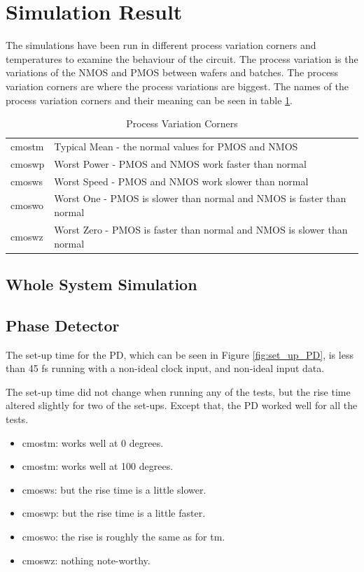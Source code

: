 \documentclass[a4paper,12pt]{article} \usepackage{graphicx}
\begin{document}
\section{Simulation Result}
The simulations have been run in different process variation corners and
temperatures to examine the behaviour of the circuit. The process variation is
the variations of the NMOS and PMOS between wafers and batches. 
The process variation corners are where the process variations are biggest.
The names of the process variation corners and their meaning can be seen in
table \ref{tab:corners}.

\begin{table}[h!]
        \centering
        \begin{tabular}{|l|l|}
                \hline 
                cmostm & Typical Mean - the normal values for PMOS and NMOS \\
                cmoswp & Worst Power - PMOS and NMOS work faster than normal \\
                cmosws & Worst Speed - PMOS and NMOS work slower than normal \\
                cmoswo & Worst One - PMOS is slower than normal and NMOS is
                faster than normal \\
                cmoswz & Worst Zero - PMOS is faster than normal and NMOS is
                slower than normal \\
                \hline
        \end{tabular}
        \caption{Process Variation Corners}
        \label{tab:corners}
\end{table}

\subsection{Whole System Simulation}
\subsection{Phase Detector}
The set-up time for the PD, which can be seen in Figure \ref{fig:set_up_PD}, is less than 45 fs
running with a non-ideal clock input, and non-ideal input data.

The set-up time did not change when running any of the tests, but the rise time altered slightly
for two of the set-ups. Except that, the PD worked well for all the tests.

\begin{itemize}
        \item cmostm: works well at 0 degrees.
        \item cmostm: works well at 100 degrees.
        \item cmosws: but the rise time is a little slower.
        \item cmoswp: but the rise time is a little faster.
        \item cmoswo: the rise is roughly the same as for tm.
        \item cmoswz: nothing note-worthy.
\end{itemize}
\end{document}
